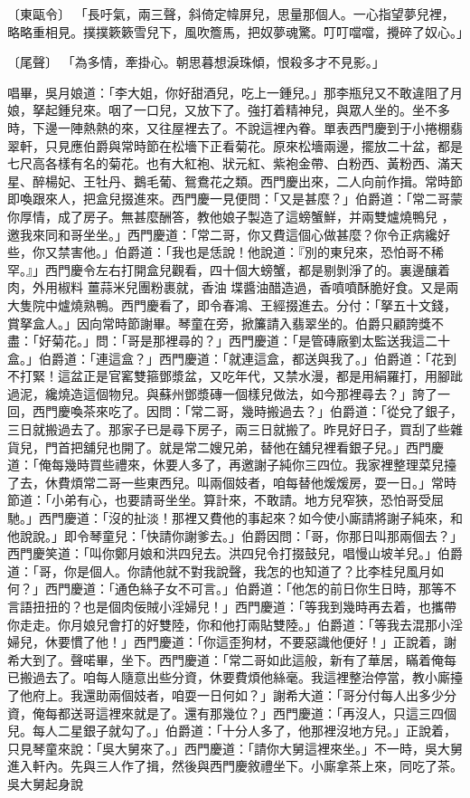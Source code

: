 \begin{showcontents}{}
〔東甌令〕 「長吁氣，兩三聲，斜倚定幃屏兒，思量那個人。一心指望夢兒裡，略略重相見。撲撲簌簌雪兒下，風吹簷馬，把奴夢魂驚。叮叮噹噹，攪碎了奴心。」

〔尾聲〕  「為多情，牽掛心。朝思暮想淚珠傾，恨殺多才不見影。」

唱畢，吳月娘道：「李大姐，你好甜酒兒，吃上一鍾兒。」那李瓶兒又不敢違阻了月娘，拏起鍾兒來。咽了一口兒，又放下了。強打着精神兒，與眾人坐的。坐不多時，下邊一陣熱熱的來，又往屋裡去了。不說這裡內眷。單表西門慶到于小捲棚翡翠軒，只見應伯爵與常時節在松墻下正看菊花。原來松墻兩邊，擺放二十盆，都是七尺高各樣有名的菊花。也有大紅袍、狀元紅、紫袍金帶、白粉西、黃粉西、滿天星、醉楊妃、王牡丹、鵝毛葡、鴛鴦花之類。西門慶出來，二人向前作揖。常時節即喚跟來人，把盒兒掇進來。西門慶一見便問：「又是甚麼？」伯爵道：「常二哥蒙你厚情，成了房子。無甚麼酬答，教他娘子製造了這螃蟹鮮，并兩雙爐燒鴨兒 ，邀我來同和哥坐坐。」西門慶道：「常二哥，你又費這個心做甚麼？你令正病纔好些，你又禁害他。」伯爵道：「我也是恁說！他說道：『別的東兒來，恐怕哥不稀罕。』」西門慶令左右打開盒兒觀看，四十個大螃蟹，都是剔剝淨了的。裏邊釀着肉，外用椒料 薑蒜米兒團粉裹就，香油 堞醬油醋造過，香噴噴酥脆好食。又是兩大隻院中爐燒熟鴨。西門慶看了，即令春鴻、王經掇進去。分付：「拏五十文錢，賞拏盒人。」因向常時節謝畢。琴童在旁，掀簾請入翡翠坐的。伯爵只顧誇獎不盡：「好菊花。」問：「哥是那裡尋的？」西門慶道：「是管磚廠劉太監送我這二十盒。」伯爵道：「連這盒？」西門慶道：「就連這盒，都送與我了。」伯爵道：「花到不打緊！這盆正是官窰雙箍鄧漿盆，又吃年代，又禁水漫，都是用絹羅打，用腳跐過泥，纔燒造這個物兒。與蘇州鄧漿磚一個樣兒做法，如今那裡尋去？」誇了一回，西門慶喚茶來吃了。因問：「常二哥，幾時搬過去？」伯爵道：「從兌了銀子，三日就搬過去了。那家子已是尋下房子，兩三日就搬了。昨見好日子，買刮了些雜貨兒，門首把舖兒也開了。就是常二嫂兄弟，替他在舖兒裡看銀子兒。」西門慶道：「俺每幾時買些禮來，休要人多了，再邀謝子純你三四位。我家裡整理菜兒擡了去，休費煩常二哥一些東西兒。叫兩個妓者，咱每替他煖煖房，耍一日。」常時節道：「小弟有心，也要請哥坐坐。算計來，不敢請。地方兒窄狹，恐怕哥受屈馳。」西門慶道：「沒的扯淡！那裡又費他的事起來？如今使小廝請將謝子純來，和他說說。」即令琴童兒：「快請你謝爹去。」伯爵因問：「哥，你那日叫那兩個去？」西門慶笑道：「叫你鄭月娘和洪四兒去。洪四兒令打掇鼓兒，唱慢山坡羊兒。」伯爵道：「哥，你是個人。你請他就不對我說聲，我怎的也知道了？比李桂兒風月如何？」西門慶道：「通色絲子女不可言。」伯爵道：「他怎的前日你生日時，那等不言語扭扭的？也是個肉佞賊小淫婦兒！」西門慶道：「等我到幾時再去着，也攜帶你走走。你月娘兒會打的好雙陸，你和他打兩貼雙陸。」伯爵道：「等我去混那小淫婦兒，休要慣了他！」西門慶道：「你這歪狗材，不要惡識他便好！」正說着，謝希大到了。聲喏畢，坐下。西門慶道：「常二哥如此這般，新有了華居，瞞着俺每已搬過去了。咱每人隨意出些分資，休要費煩他絲毫。我這裡整治停當，教小廝擡了他府上。我還助兩個妓者，咱耍一日何如？」謝希大道：「哥分付每人出多少分資，俺每都送哥這裡來就是了。還有那幾位？」西門慶道：「再沒人，只這三四個兒。每人二星銀子就勾了。」伯爵道：「十分人多了，他那裡沒地方兒。」正說着，只見琴童來說：「吳大舅來了。」西門慶道：「請你大舅這裡來坐。」不一時，吳大舅進入軒內。先與三人作了揖，然後與西門慶敘禮坐下。小廝拿茶上來，同吃了茶。吳大舅起身說
\end{showcontents}
